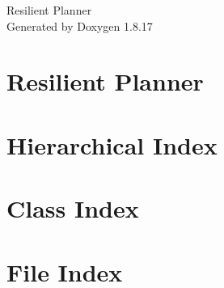 \let\mypdfximage\pdfximage\def\pdfximage{\immediate\mypdfximage}\documentclass[twoside]{book}
\newcommand{\+}{\discretionary{\mbox{\scriptsize$\hookleftarrow$}}{}{}}
\newcommand{\clearemptydoublepage}{%
  \newpage{\pagestyle{empty}\cleardoublepage}%
}
\begin{document}
\hypersetup{pageanchor=false,
             bookmarksnumbered=true,
             pdfencoding=unicode
            }
\begin{titlepage}
\vspace*{7cm}
\begin{center}%
{\Large Resilient Planner }\\
\vspace*{1cm}
{\large Generated by Doxygen 1.8.17}\\
\end{center}
\end{titlepage}
\clearemptydoublepage
{}
\tableofcontents
\clearemptydoublepage
{}
\hypersetup{pageanchor=true}

\chapter{Resilient Planner}
\label{index}\hypertarget{index}{}
\chapter{Hierarchical Index}

\chapter{Class Index}

\chapter{File Index}

\end{document}
